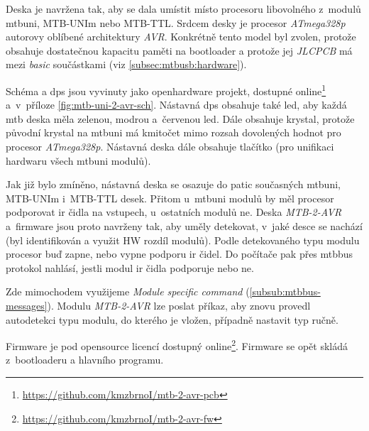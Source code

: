 Deska je navržena tak, aby se dala umístit místo procesoru libovolného z~modulů
\gls{mtbuni}, MTB-UNIm nebo MTB-TTL. Srdcem desky je procesor
\textit{ATmega328p} autorovy oblíbené architektury \textit{AVR}.
Konkrétně tento model byl zvolen, protože obsahuje dostatečnou kapacitu paměti
na bootloader a protože jej \textit{JLCPCB} má mezi \textit{basic} součástkami
(viz \ref{subsec:mtbusb:hardware}).

Schéma a \gls{dps} jsou vyvinuty jako openhardware projekt, dostupné
online\footnote{\url{https://github.com/kmzbrnoI/mtb-2-avr-pcb}} a~v~příloze
\ref{fig:mtb-uni-2-avr-sch}. Nástavná \gls{dps} obsahuje také \gls{led}, aby každá
\gls{mtb} deska měla zelenou, modrou a~červenou \gls{led}. Dále obsahuje krystal,
protože původní krystal na \gls{mtbuni} má kmitočet mimo rozsah dovolených
hodnot pro procesor \textit{ATmega328p}. Nástavná deska dále
obsahuje tlačítko (pro unifikaci hardwaru všech \gls{mtbuni} modulů).

Jak již bylo zmíněno, nástavná deska se osazuje do patic současných
\gls{mtbuni}, MTB-UNIm i~MTB-TTL desek. Přitom u~\gls{mtbuni} modulů by měl
procesor podporovat \gls{ir} čidla na vstupech, u~ostatních modulů ne. Deska \textit{MTB-2-AVR}
a~firmware jsou proto navrženy tak, aby uměly detekovat, v~jaké desce se
nachází (byl identifikován a využit HW rozdíl modulů). Podle detekovaného typu
modulu procesor buď zapne, nebo vypne podporu \gls{ir} čidel. Do počítače pak přes
\gls{mtbbus} protokol nahlásí, jestli modul \gls{ir} čidla podporuje nebo ne.

Zde mimochodem využijeme \textit{Module specific command}
(\ref{subsub:mtbbus-messages}). Modulu \textit{MTB-2-AVR} lze poslat příkaz,
aby znovu provedl autodetekci typu modulu, do kterého je vložen, případně
nastavit typ ručně.

Firmware je pod opensource licencí dostupný
online\footnote{\url{https://github.com/kmzbrnoI/mtb-2-avr-fw}}.
Firmware se opět skládá z~bootloaderu a hlavního programu.
